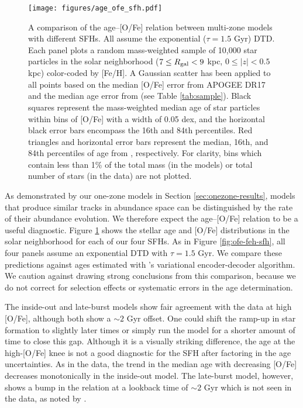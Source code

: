 \documentclass[twocolumn,twocolappendix,linenumbers]{aastex631}
\begin{document}
\begin{figure}
    \centering
    \texttt{[image: figures/age\_ofe\_sfh.pdf]}
    \caption{A comparison of the age--[O/Fe] relation between multi-zone models with different SFHs. All assume the exponential ($\tau=1.5$ Gyr) DTD. Each panel plots a random mass-weighted sample of 10,000 star particles in the solar neighborhood ($7\leq R_{\rm gal}<9$ kpc, $0\leq|z|<0.5$ kpc) color-coded by [Fe/H]. A Gaussian scatter has been applied to all points based on the median [O/Fe] error from APOGEE DR17 and the median age error from  (see Table \ref{tab:sample}). Black squares represent the mass-weighted median age of star particles within bins of [O/Fe] with a width of 0.05 dex, and the horizontal black error bars encompass the 16th and 84th percentiles. Red triangles and horizontal error bars represent the median, 16th, and 84th percentiles of age from , respectively. For clarity, bins which contain less than 1\% of the total mass (in the models) or total number of stars (in the data) are not plotted.}
    \label{fig:age-ofe-sfh}
\end{figure}

As demonstrated by our one-zone models in Section \ref{sec:onezone-results}, models that produce similar tracks in abundance space can be distinguished by the rate of their abundance evolution. We therefore expect the age--[O/Fe] relation to be a useful diagnostic. Figure \ref{fig:age-ofe-sfh} shows the stellar age and [O/Fe] distributions in the solar neighborhood for each of our four SFHs. As in Figure \ref{fig:ofe-feh-sfh}, all four panels assume an exponential DTD with $\tau=1.5$ Gyr. We compare these predictions against ages estimated with 's variational encoder-decoder algorithm. We caution against drawing strong conclusions from this comparison, because we do not correct for selection effects or systematic errors in the age determination. 

The inside-out and late-burst models show fair agreement with the data at high [O/Fe], although both show a $\sim2$ Gyr offset. One could shift the ramp-up in star formation to slightly later times or simply run the model for a shorter amount of time to close this gap. Although it is a visually striking difference, the age at the high-[O/Fe] knee is not a good diagnostic for the SFH after factoring in the age uncertainties. As in the data, the trend in the median age with decreasing [O/Fe] decreases monotonically in the inside-out model. The late-burst model, however, shows a bump in the relation at a lookback time of $\sim2$ Gyr which is not seen in the data, as noted by .
\end{document}
